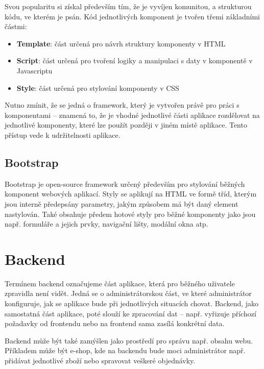 	Svou popularitu si získal především tím, že je vyvíjen komunitou, a strukturou kódu, ve kterém je psán. Kód jednotlivých komponent je tvořen třemi základními částmi:
	
	\begin{itemize}
		\item \textbf{Template}: část určená pro návrh struktury komponenty v HTML
		\item \textbf{Script}: část určená pro tvoření logiky a manipulaci s daty v komponentě v Javascriptu
		\item \textbf{Style}: část určená pro stylování komponenty v CSS
	\end{itemize}

	Nutno zmínit, že se jedná o framework, který je vytvořen právě pro práci s komponentami – znamená to, že je vhodné jednotlivé části aplikace rozdělovat na jednotlivé komponenty, které lze použít později v jiném místě aplikace. Tento přístup vede k udržitelnosti aplikace. \cite{VueJSSyntax} \cite{VueJS2}
	
	\subsection{Bootstrap}
	Bootstrap je open-source framework určený především pro stylování běžných komponent webových aplikací. Styly se aplikují na HTML ve formě tříd, kterým jsou interně předepsány parametry, jakým způsobem má být daný element nastylován. Také obsahuje předem hotové styly pro běžné komponenty jako jsou např. formuláře a jejich prvky, navigační lišty, modální okna atp. \cite{Bootstrap1}  \cite{Bootstrap2}  \cite{Bootstrap3}

\section{Backend}
Termínem backend označujeme část aplikace, která pro běžného uživatele zpravidla není vidět. Jedná se o administrátorskou část, ve které administrátor konfiguruje, jak se aplikace bude při jednotlivých situacích chovat. Backend, jako samostatná část aplikace, poté slouží ke zpracování dat – např. vyřizuje příchozí požadavky od frontendu nebo na frontend sama zasílá konkrétní data.

Backend může být také zamýšlen jako prostředí pro správu např. obsahu webu. Příkladem může být e-shop, kde na backendu bude moci administrátor např. přidávat jednotlivé zboží nebo spravovat veškeré objednávky.  \cite{BE1} \cite{BE2}

